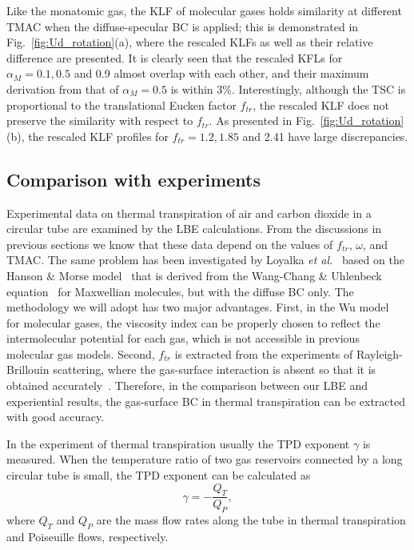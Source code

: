 Like the monatomic gas, the KLF of molecular gases holds similarity at different TMAC when the diffuse-specular BC is applied; this is demonstrated in Fig.~\ref{fig:Ud_rotation}(a), where the rescaled KLFs as well as their relative difference are presented.
It is clearly seen that the rescaled KFLs for $\alpha_M=0.1, 0.5$ and 0.9 almost overlap with each other,  and their maximum derivation from that of $\alpha_M=0.5$ is within $3\%$. Interestingly, although the TSC is proportional to the translational Eucken factor $f_{tr}$, the rescaled KLF does not preserve the similarity with respect to $f_{tr}$. As presented in Fig.~\ref{fig:Ud_rotation}(b), the rescaled KLF profiles for $f_{tr}=1.2, 1.85$ and 2.41 have large discrepancies. 






\subsection{Comparison with experiments\label{sec:results3}}


Experimental data on thermal transpiration of air and carbon dioxide in a circular tube are examined by the LBE calculations. From the discussions in previous sections we know that these data depend on the values of $f_{tr}$, $\omega$, and TMAC. The same problem has been investigated by Loyalka \textit{et al.}~\cite{loyalka1982thermal} based on the Hanson \& Morse model~\cite{Hanson1967PoF} that is derived from the Wang-Chang \& Uhlenbeck equation~\cite{WangCS} for Maxwellian molecules, but with the diffuse BC only. The methodology we will adopt has two major advantages. First, in the Wu model~\cite{LeiJFM2015} for molecular gases, the viscosity index can be properly chosen to reflect the intermolecular potential for each gas, which is not accessible in previous molecular gas models. Second, $f_{tr}$ is extracted from the experiments of Rayleigh-Brillouin scattering, where the gas-surface interaction is absent so that it is obtained accurately~\citep{Wu2020JFM}. Therefore, in the comparison between our LBE and experiential results, the gas-surface BC in thermal transpiration can be extracted with good accuracy.


In the experiment of thermal transpiration usually the TPD exponent $\gamma$ is measured. When the temperature ratio of two gas reservoirs connected by a long circular tube is small, the TPD exponent can be calculated as
\begin{equation}
\gamma=-\frac{Q_{T}}{Q_P},
\end{equation}
where $Q_{T}$ and $Q_P$ are the mass flow rates along the tube in thermal transpiration and Poiseuille flows, respectively. 


